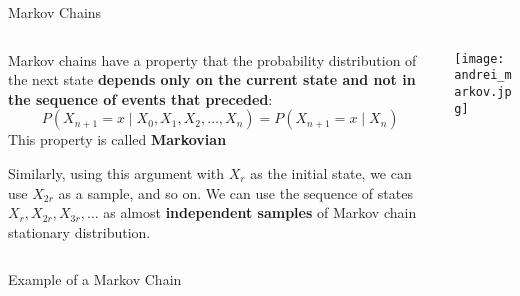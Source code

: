 \begin{frame}{Markov Chains}
	\begin{columns}
		\begin{column}{0.8\textwidth}
			\begin{vfilleditems}
				\item Markov chains have a property that the probability distribution of the next state
				\textbf{depends only on the current state and not in the sequence of events that preceded}:
				$$
					P(X_{n+1}=x \mid X_{0},X_{1},X_{2},\ldots ,X_{n}) = P(X_{n+1}=x \mid X_{n})
				$$
				This property is called \textbf{Markovian}
				\item Similarly, using this argument with $X_r$ as the initial state,
				we can use $X_{2r}$ as a sample, and so on.
				We can use the sequence of states $X_r, X_{2r}, X_{3r}, \dots$
				as almost \textbf{independent samples} of Markov chain stationary distribution.
			\end{vfilleditems}
		\end{column}
		\begin{column}{0.2\textwidth}
			\centering
			\texttt{[image: andrei\_markov.jpg]}
		\end{column}
	\end{columns}
\end{frame}

\begin{frame}{Example of a Markov Chain}
	\centering
\end{frame}

